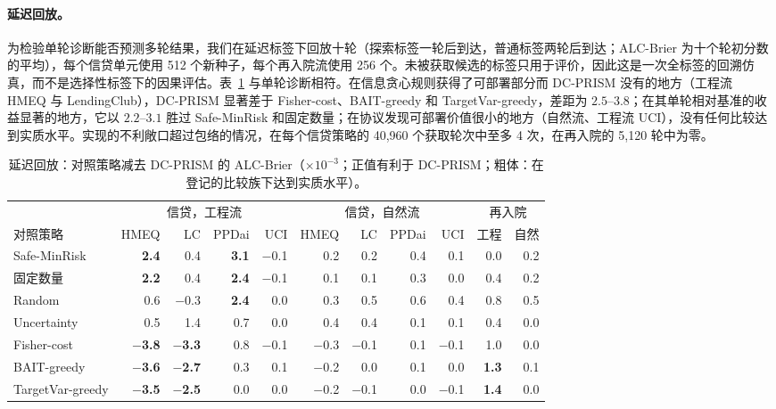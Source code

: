 \documentclass[runningheads]{llncs}
\begin{document}
\paragraph{延迟回放。}为检验单轮诊断能否预测多轮结果，我们在延迟标签下回放十轮（探索标签一轮后到达，普通标签两轮后到达；ALC-Brier 为十个轮初分数的平均），每个信贷单元使用 512 个新种子，每个再入院流使用 256 个。未被获取候选的标签只用于评价，因此这是一次全标签的回溯仿真，而不是选择性标签下的因果评估。表~\ref{tab:replay} 与单轮诊断相符。在信息贪心规则获得了可部署部分而 DC-PRISM 没有的地方（工程流 HMEQ 与 LendingClub），DC-PRISM 显著差于 Fisher-cost、BAIT-greedy 和 TargetVar-greedy，差距为 $2.5$--$3.8$；在其单轮相对基准的收益显著的地方，它以 $2.2$--$3.1$ 胜过 Safe-MinRisk 和固定数量；在协议发现可部署价值很小的地方（自然流、工程流 UCI），没有任何比较达到实质水平。实现的不利敞口超过包络的情况，在每个信贷策略的 40{,}960 个获取轮次中至多 4 次，在再入院的 5{,}120 轮中为零。

\begin{table}[t]
\caption{延迟回放：对照策略减去 DC-PRISM 的 ALC-Brier（$\times10^{-3}$；正值有利于 DC-PRISM；粗体：在登记的比较族下达到实质水平）。}
\label{tab:replay}
\centering\scriptsize
\setlength{\tabcolsep}{2.4pt}
\begin{tabular}{lrrrrrrrrrr}
\toprule
& \multicolumn{4}{c}{信贷，工程流} & \multicolumn{4}{c}{信贷，自然流} & \multicolumn{2}{c}{再入院} \\
\cmidrule(lr){2-5}\cmidrule(lr){6-9}\cmidrule(lr){10-11}
对照策略 & HMEQ & LC & PPDai & UCI & HMEQ & LC & PPDai & UCI & 工程 & 自然 \\
\midrule
Safe-MinRisk & \textbf{2.4} & 0.4 & \textbf{3.1} & $-$0.1 & 0.2 & 0.2 & 0.4 & 0.1 & 0.0 & 0.2 \\
固定数量 & \textbf{2.2} & 0.4 & \textbf{2.4} & $-$0.1 & 0.1 & 0.1 & 0.3 & 0.0 & 0.4 & 0.2 \\
Random & 0.6 & $-$0.3 & \textbf{2.4} & 0.0 & 0.3 & 0.5 & 0.6 & 0.4 & 0.8 & 0.5 \\
Uncertainty & 0.5 & 1.4 & 0.7 & 0.0 & 0.4 & 0.4 & 0.1 & 0.1 & 0.4 & 0.0 \\
Fisher-cost & \textbf{$-$3.8} & \textbf{$-$3.3} & 0.8 & $-$0.1 & $-$0.3 & $-$0.1 & 0.1 & $-$0.1 & 1.0 & 0.0 \\
BAIT-greedy & \textbf{$-$3.6} & \textbf{$-$2.7} & 0.3 & 0.1 & $-$0.2 & 0.0 & 0.1 & 0.0 & \textbf{1.3} & 0.1 \\
TargetVar-greedy & \textbf{$-$3.5} & \textbf{$-$2.5} & 0.0 & 0.0 & $-$0.2 & $-$0.1 & 0.0 & $-$0.1 & \textbf{1.4} & 0.0 \\
\bottomrule
\end{tabular}
\end{table}
\end{document}
